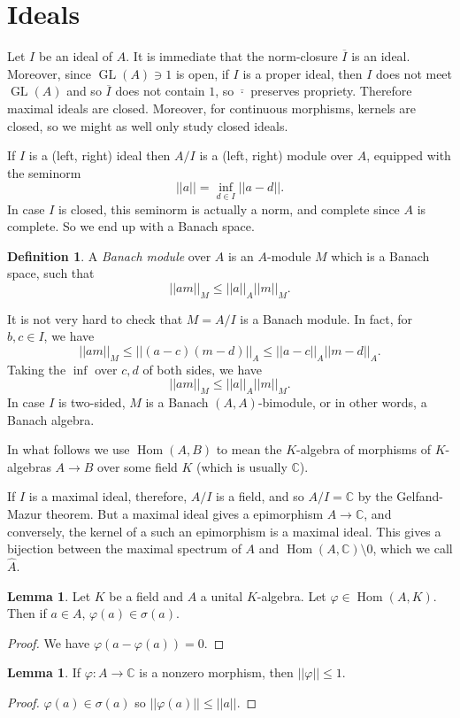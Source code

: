 \documentclass[12pt]{report}
\newcommand{\CC}{\mathbb{C}}
\newcommand{\GL}{\operatorname{GL}}
\newcommand{\Hom}{\operatorname{Hom}}
\newcommand{\dfn}[1]{\emph{#1}\index{#1}}
\theoremstyle{definition}
\newtheorem{lemma}[theorem]{Lemma}
\newtheorem{definition}[theorem]{Definition}
\begin{document}
\section{Ideals}
Let $I$ be an ideal of $A$. It is immediate that the norm-closure $\overline I$ is an ideal. Moreover, since $\GL(A) \ni 1$ is open, if $I$ is a proper ideal, then $I$ does not meet $\GL(A)$ and so $\overline I$ does not contain $1$, so $\overline \cdot$ preserves propriety. Therefore maximal ideals are closed. Moreover, for continuous morphisms, kernels are closed, so we might as well only study closed ideals.

If $I$ is a (left, right) ideal then $A/I$ is a (left, right) module over $A$, equipped with the seminorm
$$||a|| = \inf_{d \in I} ||a - d||.$$
In case $I$ is closed, this seminorm is actually a norm, and complete since $A$ is complete. So we end up with a Banach space.

\begin{definition}
    A \dfn{Banach module} over $A$ is an $A$-module $M$ which is a Banach space, such that
    $$||am||_M \leq ||a||_A ||m||_M.$$
\end{definition}
It is not very hard to check that $M = A/I$ is a Banach module. In fact, for $b, c \in I$, we have
$$||am||_M \leq ||(a - c)(m - d)||_A \leq ||a - c||_A ||m - d||_A.$$
Taking the $\inf$ over $c, d$ of both sides, we have
$$||am||_M \leq ||a||_A ||m||_M.$$
In case $I$ is two-sided, $M$ is a Banach $(A, A)$-bimodule, or in other words, a Banach algebra.

In what follows we use $\Hom(A, B)$ to mean the $K$-algebra of morphisms of $K$-algebras $A \to B$ over some field $K$ (which is usually $\CC$).

If $I$ is a maximal ideal, therefore, $A/I$ is a field, and so $A/I = \CC$ by the Gelfand-Mazur theorem. But a maximal ideal gives a epimorphism $A \to \CC$, and conversely, the kernel of a such an epimorphism is a maximal ideal. This gives a bijection between the maximal spectrum of $A$ and $\Hom(A, \CC) \setminus 0$, which we call $\hat A$.

\begin{lemma}
    Let $K$ be a field and $A$ a unital $K$-algebra. Let $\varphi \in \Hom(A, K)$. Then if $a \in A$, $\varphi(a) \in \sigma(a)$.
\end{lemma}
\begin{proof}
    We have $\varphi(a - \varphi(a)) = 0$.
\end{proof}
\begin{lemma}
    If $\varphi: A \to \CC$ is a nonzero morphism, then $||\varphi|| \leq 1$.
\end{lemma}
\begin{proof}
    $\varphi(a) \in \sigma(a)$ so $||\varphi(a)|| \leq ||a||$.
\end{proof}
\end{document}
